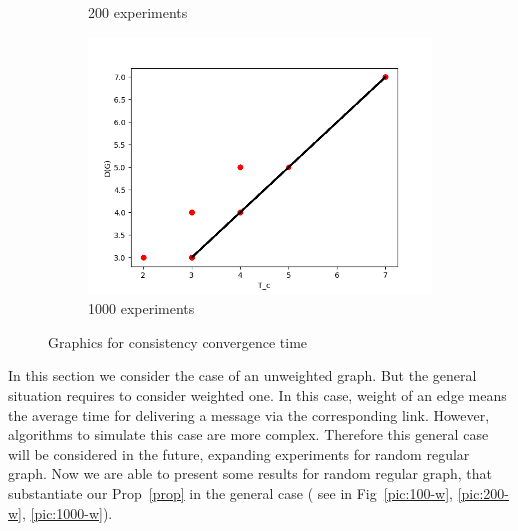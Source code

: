 \documentclass[a4paper,14pt]{llncs}
\begin{document}
\begin{figure}[p]
\begin{subfigure}{0.3\linewidth}
\caption{200 experiments}\label{pic:200}
\end{subfigure}
\begin{subfigure}{0.3\linewidth}
\centering\includegraphics[width=\linewidth]{images/1000-consistency-convergence.png}
\caption{1000 experiments}\label{pic:1000}
\end{subfigure}
\caption{Graphics for consistency convergence time}
\end{figure}
%
In this section we consider the case of an unweighted graph. 
But the general situation requires to consider weighted one.
In this case, weight of an edge means the average time for delivering a message via the corresponding link.
However, algorithms to simulate this case are more complex.
Therefore this general case will be considered in the future, expanding experiments for random regular graph. Now we are able to present some results for random regular graph, that substantiate our Prop~\ref{prop} in the general case (
see in Fig~\ref{pic:100-w}, \ref{pic:200-w}, \ref{pic:1000-w}).
\end{document}
